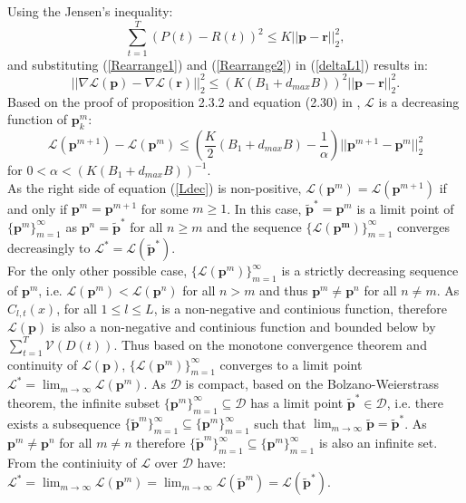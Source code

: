 \documentclass[12pt,draftcls,onecolumn]{IEEEtran}
\begin{document}
Using the Jensen\rq{}s inequality:
\begin{equation}
\sum_{t=1}^{T}(P(t)-R(t))^2 \leq K||\mathbf{p}-\mathbf{r}||_2^2,
\label{Jensen1}
\end{equation}
and substituting (\ref{Rearrange1}) and (\ref{Rearrange2}) in (\ref{deltaL1}) results in:\\
\begin{equation}
||\nabla \mathcal{L}(\mathbf{p})- \nabla \mathcal{L}(\mathbf{r})||_2^2 \leq (K(B_1+d_{max}B))^2||\mathbf{p}-\mathbf{r}||_2^2.
\label{squaredel}
\end{equation}
\indent Based on the proof of proposition 2.3.2 and equation (2.30) in \cite{B99}, $\mathcal{L}$ is a decreasing function of $\mathbf{p}^m_k$:\\
\begin{equation}
\mathcal{L}(\mathbf{p}^{m+1})-\mathcal{L}(\mathbf{p}^{m}) \leq (\frac{K}{2}(B_1+d_{max}B)-\frac{1}{\alpha})||\mathbf{p}^{m+1}-\mathbf{p}^{m}||_2^2
\label{Ldec}
\end{equation}
 for $0 < \alpha < (K(B_{1}+d_{max}B))^{-1}$.\\
 \indent As the right side of equation (\ref{Ldec}) is non-positive, $\mathcal{L}(\mathbf{p}^{m})=\mathcal{L}(\mathbf{p}^{m+1})$ if and only if $\mathbf{p}^{m}=\mathbf{p}^{m+1}$ for some $m \geq 1$. In this case, $\mathbf{\tilde{p}}^{*}=\mathbf{p}^{m}$ is a limit point of $\{\mathbf{p}^{m}\}_{m=1}^{\infty}$ as $\mathbf{p}^{n}=\mathbf{\tilde{p}}^{*}$ for all $n \geq m$ and the sequence $\{\mathcal{L}(\mathbf{p^{m}})\}_{m=1}^{\infty}$ converges decreasingly to $\mathcal{L}^*=\mathcal{L}(\mathbf{\tilde{p}}^*)$.\\
 \indent For the only other possible case, $\{\mathcal{L}(\mathbf{p}^{m})\}_{m=1}^{\infty}$ is a strictly decreasing sequence of $\mathbf{p}^m$, i.e. $\mathcal{L}(\mathbf{p}^{m}) < \mathcal{L}(\mathbf{p}^{n})$ for all $n > m$ and thus $\mathbf{p}^m \neq \mathbf{p}^n$ for all $n \neq m$. As $C_{l,t}(x)$, for all $1 \leq l \leq L$, is a non-negative and continious function, therefore $\mathcal{L}(\mathbf{p})$ is also a non-negative and continious function and bounded below by $\sum_{t=1}^{T}\mathcal{V}(D(t))$. Thus based on the monotone convergence theorem and continuity of $\mathcal{L}(\mathbf{p})$, $\{ \mathcal{L}(\mathbf{p}^{m}) \}_{m=1}^{\infty}$ converges to a limit point $\mathcal{L}^{*}=\lim_{m \rightarrow \infty} \mathcal{L}(\mathbf{p}^{m})$. As $\mathcal{D}$ is compact, based on the Bolzano-Weierstrass theorem, the infinite subset $\{\mathbf{p}^{m}\}_{m=1}^{\infty} \subseteq \mathcal{D}$ has a limit point $\mathbf{\tilde{p}}^{*} \in \mathcal{D}$, i.e. there exists a subsequence $\{\mathbf{\tilde{p}}^{m}\}_{m=1}^{\infty} \subseteq \{ \mathbf{p}^{m}\}_{m=1}^{\infty}$ such that $\lim_{m \rightarrow \infty} \mathbf{\tilde{p}} = \mathbf{\tilde{p}}^{*}$. As $\mathbf{p}^m \neq \mathbf{p}^n$ for all $m \neq n$ therefore $\{\mathbf{\tilde{p}}^{m}\}_{m=1}^{\infty} \subseteq \{ \mathbf{p}^{m}\}_{m=1}^{\infty}$ is also an infinite set. From the continiuity of $\mathcal{L}$ over $\mathcal{D}$ have: $\mathcal{L}^{*}=\lim_{m \rightarrow \infty} \mathcal{L}(\mathbf{p}^{m})=\lim_{m \rightarrow \infty} \mathcal{L} (\mathbf{\tilde{p}}^{m}) = \mathcal{L}(\mathbf{\tilde{p}}^*)$.  \\
\end{document}
